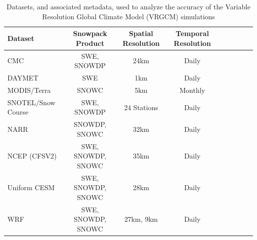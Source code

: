 \documentclass[11pt]{article}
\begin{document}
\begin{table}[t]
\caption{Datasets, and associated metadata, used to analyze the accuracy of the Variable Resolution Global Climate Model (VRGCM) simulations}\label{t1}
\begin{center}
\begin{tabular*}{\textwidth}{@{\extracolsep\fill}lcccccccc}
\hline
Dataset & Snowpack  Product & Spatial  Resolution & Temporal Resolution \\
\hline
 CMC & SWE, SNOWDP & 24km & Daily\\
 DAYMET & SWE & 1km & Daily \\
 MODIS/Terra & SNOWC & 5km & Monthly \\
 SNOTEL/Snow Course & SWE, SNOWDP & 24 Stations & Daily \\
 NARR & SNOWDP, SNOWC & 32km & Daily \\
 NCEP (CFSV2) & SWE, SNOWDP, SNOWC & 35km & Daily \\
\hline
 Uniform CESM & SWE, SNOWDP, SNOWC & 28km & Daily \\
 WRF & SWE, SNOWDP, SNOWC & 27km, 9km & Daily \\
\hline
\end{tabular*}
\end{center}
\end{table}
\end{document}
